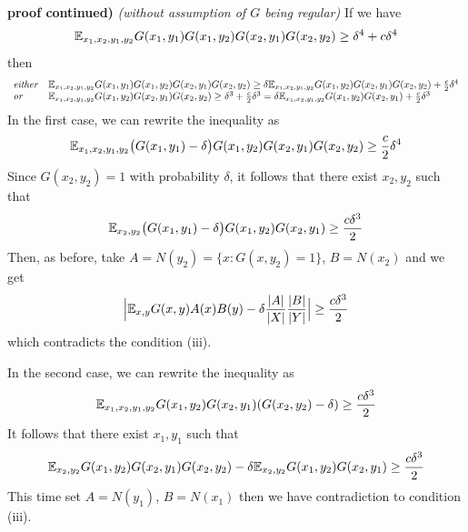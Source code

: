 \documentclass[12pt,a4paper]{report}
\begin{document}
\begin{changemargin}{0.5cm}{0.5cm}
\textbf{proof continued)} \emph{(without assumption of $G$ being regular)} If we have
\begin{align*}
\mathbb{E}_{x_1, x_2, y_1, y_2} G(x_1, y_1) G(x_1,y_2) G(x_2,y_1) G(x_2,y_2) \geq \delta^4 + c\delta^4
\end{align*}
then
\begin{align*}
\begin{array}{ll}
\text{\emph{either}} & \mathbb{E}_{x_1, x_2, y_1, y_2} G(x_1, y_1) G(x_1,y_2) G(x_2,y_1) G(x_2,y_2) \geq \delta \mathbb{E}_{x_1, x_2, y_1, y_2} G(x_1,y_2) G(x_2,y_1) G(x_2,y_2) + \frac{c}{2} \delta^4 \\
\text{\emph{or}} & \mathbb{E}_{x_1, x_2, y_1, y_2} G(x_1,y_2) G(x_2,y_1) G(x_2,y_2) \geq \delta^3 + \frac{c}{2}\delta^3 = \delta \mathbb{E}_{x_1, x_2, y_1, y_2} G(x_1,y_2) G(x_2,y_1) + \frac{c}{2}\delta^3
\end{array}
\end{align*}
In the first case, we can rewrite the inequality as
\begin{align*}
\mathbb{E}_{x_1, x_2, y_1, y_2} \big( G(x_1,y_1) -\delta \big) G(x_1,y_2) G(x_2,y_1) G(x_2,y_2) \geq \frac{c}{2} \delta^4
\end{align*}
Since $G(x_2, y_2)=1$ with probability $\delta$, it follows that there exist $x_2, y_2$ such that
\begin{align*}
\mathbb{E}_{x_2, y_2} \big( G(x_1,y_1) -\delta \big) G(x_1,y_2) G(x_2,y_1) \geq \frac{c\delta^3}{2}
\end{align*}
Then, as before, take $A = N(y_2)= \{ x:G(x,y_2)=1 \}$, $B=N(x_2)$ and we get
\begin{align*}
\Big| \mathbb{E}_{x,y} G(x,y) A(x)B(y) - \delta \frac{|A|}{|X|} \frac{|B|}{|Y|} \Big| \geq \frac{c\delta^3}{2}
\end{align*}
which contradicts the condition (iii).

\quad In the second case, we can rewrite the inequality as
\begin{align*}
\mathbb{E}_{x_1, x_2, y_1, y_2} G(x_1,y_2) G(x_2,y_1) (G(x_2,y_2) - \delta) \geq \frac{c\delta^3}{2}
\end{align*}
It follows that there exist $x_1, y_1$ such that
\begin{align*}
\mathbb{E}_{x_2, y_2} G(x_1,y_2) G(x_2,y_1) G(x_2,y_2) - \delta \mathbb{E}_{x_2, y_2} G(x_1,y_2) G(x_2,y_1) \geq \frac{c\delta^3}{2}
\end{align*}
This time set $A = N(y_1)$, $B=N(x_1)$ then we have contradiction to condition (iii).

\eop
\end{changemargin}
\end{document}
